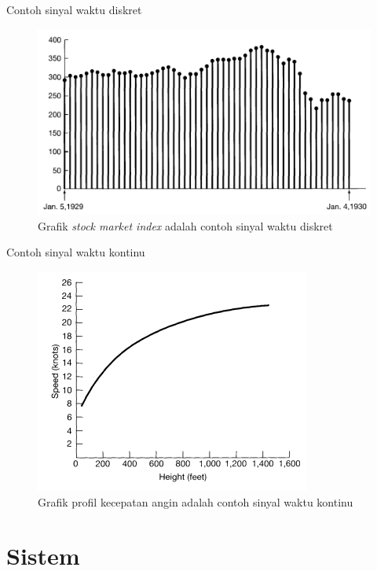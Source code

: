 \documentclass[pdflatex,compress,mathserif]{beamer}
\begin{document}
\begin{frame}{Contoh sinyal waktu diskret}
	\begin{figure}
		\includegraphics[height=0.7\textheight]{img/00.sinyal_waktu_diskret}
		\caption{Grafik \textit{stock market index} adalah contoh sinyal waktu diskret}
	\end{figure}
\end{frame}

\begin{frame}{Contoh sinyal waktu kontinu}
	
	\begin{figure}
		\includegraphics[height=0.7\textheight]{img/00.sinyal_waktu_kontinu}
		\caption{Grafik profil kecepatan angin adalah contoh sinyal waktu kontinu}
	\end{figure}
\end{frame}


\section{Sistem}
\end{document}
